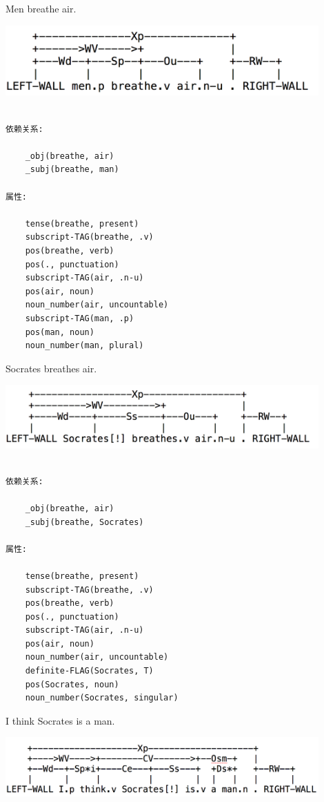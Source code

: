  Men breathe air.

\includegraphics[width=12cm]{figures/Socrates_2.png}

\begin{verbatim}

依赖关系:

    _obj(breathe, air)
    _subj(breathe, man)

属性:

    tense(breathe, present)
    subscript-TAG(breathe, .v)
    pos(breathe, verb)
    pos(., punctuation)
    subscript-TAG(air, .n-u)
    pos(air, noun)
    noun_number(air, uncountable)
    subscript-TAG(man, .p)
    pos(man, noun)
    noun_number(man, plural)

\end{verbatim}

  Socrates breathes air.

\includegraphics[width=12cm]{figures/Socrates_3.png}

\begin{verbatim}

依赖关系:

    _obj(breathe, air)
    _subj(breathe, Socrates)

属性:

    tense(breathe, present)
    subscript-TAG(breathe, .v)
    pos(breathe, verb)
    pos(., punctuation)
    subscript-TAG(air, .n-u)
    pos(air, noun)
    noun_number(air, uncountable)
    definite-FLAG(Socrates, T)
    pos(Socrates, noun)
    noun_number(Socrates, singular)

\end{verbatim}

  I think Socrates is a man.

\includegraphics[width=12cm]{figures/Socrates_4.png}

